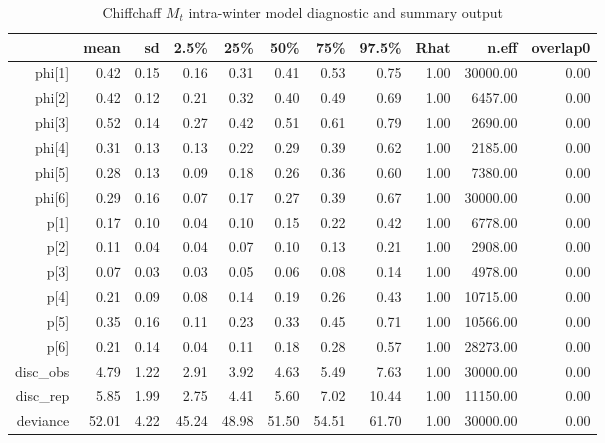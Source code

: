 \begin{table}[ht]
\centering
\begin{tabular}{rrrrrrrrrrr}
  \hline
 & mean & sd & 2.5\% & 25\% & 50\% & 75\% & 97.5\% & Rhat & n.eff & overlap0 \\ 
  \hline
phi[1] & 0.42 & 0.15 & 0.16 & 0.31 & 0.41 & 0.53 & 0.75 & 1.00 & 30000.00 & 0.00 \\ 
  phi[2] & 0.42 & 0.12 & 0.21 & 0.32 & 0.40 & 0.49 & 0.69 & 1.00 & 6457.00 & 0.00 \\ 
  phi[3] & 0.52 & 0.14 & 0.27 & 0.42 & 0.51 & 0.61 & 0.79 & 1.00 & 2690.00 & 0.00 \\ 
  phi[4] & 0.31 & 0.13 & 0.13 & 0.22 & 0.29 & 0.39 & 0.62 & 1.00 & 2185.00 & 0.00 \\ 
  phi[5] & 0.28 & 0.13 & 0.09 & 0.18 & 0.26 & 0.36 & 0.60 & 1.00 & 7380.00 & 0.00 \\ 
  phi[6] & 0.29 & 0.16 & 0.07 & 0.17 & 0.27 & 0.39 & 0.67 & 1.00 & 30000.00 & 0.00 \\ 
  p[1] & 0.17 & 0.10 & 0.04 & 0.10 & 0.15 & 0.22 & 0.42 & 1.00 & 6778.00 & 0.00 \\ 
  p[2] & 0.11 & 0.04 & 0.04 & 0.07 & 0.10 & 0.13 & 0.21 & 1.00 & 2908.00 & 0.00 \\ 
  p[3] & 0.07 & 0.03 & 0.03 & 0.05 & 0.06 & 0.08 & 0.14 & 1.00 & 4978.00 & 0.00 \\ 
  p[4] & 0.21 & 0.09 & 0.08 & 0.14 & 0.19 & 0.26 & 0.43 & 1.00 & 10715.00 & 0.00 \\ 
  p[5] & 0.35 & 0.16 & 0.11 & 0.23 & 0.33 & 0.45 & 0.71 & 1.00 & 10566.00 & 0.00 \\ 
  p[6] & 0.21 & 0.14 & 0.04 & 0.11 & 0.18 & 0.28 & 0.57 & 1.00 & 28273.00 & 0.00 \\ 
  disc\_obs & 4.79 & 1.22 & 2.91 & 3.92 & 4.63 & 5.49 & 7.63 & 1.00 & 30000.00 & 0.00 \\ 
  disc\_rep & 5.85 & 1.99 & 2.75 & 4.41 & 5.60 & 7.02 & 10.44 & 1.00 & 11150.00 & 0.00 \\ 
  deviance & 52.01 & 4.22 & 45.24 & 48.98 & 51.50 & 54.51 & 61.70 & 1.00 & 30000.00 & 0.00 \\ 
   \hline
\end{tabular}
\caption{Chiffchaff $M_t$ intra-winter model diagnostic and summary output} 
\label{tab:chiffchaff_mt_intra}
\end{table}
